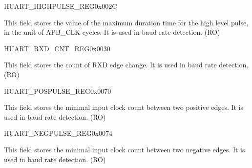 \begin{register}{H}{UART\_HIGHPULSE\_REG}{0x002C}\label{regdesc:UARTHIGHPULSEREG}
%
%
\regnewline%
\begin{regdesc}\begin{reglist}
\label{fielddesc:UARTHIGHPULSEMINCNT}\item [UART\_HIGHPULSE\_MIN\_CNT] This field stores the value of the maximum duration time for the high level pulse, in the unit of APB\_CLK cycles. It is used in baud rate detection. (RO)
\end{reglist}\end{regdesc}
\end{register}


\begin{register}{H}{UART\_RXD\_CNT\_REG}{0x0030}\label{regdesc:UARTRXDCNTREG}
%
%
\regnewline%
\begin{regdesc}\begin{reglist}
\label{fielddesc:UARTRXDEDGECNT}\item [UART\_RXD\_EDGE\_CNT] This field stores the count of RXD edge change.  It is used in baud rate detection. (RO)
\end{reglist}\end{regdesc}
\end{register}


\begin{register}{H}{UART\_POSPULSE\_REG}{0x0070}\label{regdesc:UARTPOSPULSEREG}
%
%
\regnewline%
\begin{regdesc}\begin{reglist}
\label{fielddesc:UARTPOSEDGEMINCNT}\item [UART\_POSEDGE\_MIN\_CNT] This field stores the minimal input clock count between two positive edges. It is used in baud rate detection. (RO)
\end{reglist}\end{regdesc}
\end{register}


\begin{register}{H}{UART\_NEGPULSE\_REG}{0x0074}\label{regdesc:UARTNEGPULSEREG}
%
%
\regnewline%
\begin{regdesc}\begin{reglist}
\label{fielddesc:UARTNEGEDGEMINCNT}\item [UART\_NEGEDGE\_MIN\_CNT] This field stores the minimal input clock count between two negative edges. It is used in baud rate detection. (RO)
\end{reglist}\end{regdesc}
\end{register}


